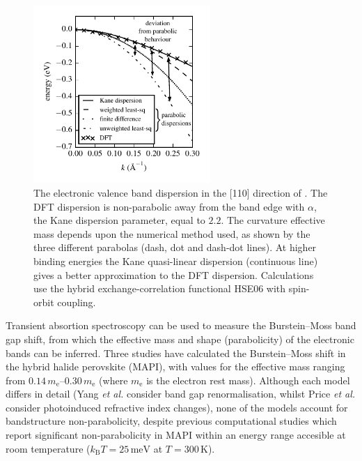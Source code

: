 \begin{figure}[tb] \centering
\includegraphics[width=0.6\textwidth]{./figures/ch4/fits_to_dispersion.pdf}
\caption[Numerical methods for fitting a band dispersion]{\label{dispersion_fits} The electronic valence band dispersion in the [110] direction of . The DFT dispersion is non-parabolic away from the band edge with $\alpha$, the Kane dispersion parameter, equal to ${2.2}$. The curvature effective mass depends upon the numerical method used, as shown by the three different parabolas (dash, dot and dash-dot lines). At higher binding energies the Kane quasi-linear dispersion (continuous line) gives a better approximation to the DFT dispersion. Calculations use the hybrid exchange-correlation functional HSE06 with spin-orbit coupling.}
\end{figure}

Transient absortion spectroscopy can be used to measure the Burstein--Moss band gap shift, from which the effective mass and shape (parabolicity) of the electronic bands can be inferred.
Three studies have calculated the Burstein--Moss shift in the hybrid halide perovskite  (MAPI), with values for the effective mass ranging from $0.14\,m_{\text{e}}$--$0.30\,m_{\text{e}}$ (where $m_{\text{e}}$ is the electron rest mass).\autocite{Manser2014,Yang2015,Price2015}
Although each model differs in detail (Yang \textit{et al.} consider band gap renormalisation,\autocite{Yang2015} whilst Price \textit{et al.} consider photoinduced refractive index changes\autocite{Price2015}), none of the models account for bandstructure non-parabolicity, despite previous computational studies which report significant non-parabolicity in MAPI within an energy range accesible at room temperature ($k_\mathrm{B}T=25\,\mathrm{meV}$ at $T=300\,\mathrm{K}$). 

